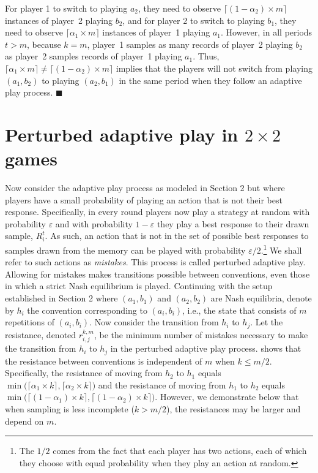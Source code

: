 For player 1 to switch to playing $a_2$, they need to observe $\lceil (1-\alpha_2)\times m\rceil$ instances of player~2 playing $b_2$, and for player 2 to switch to playing $b_1$, they need to observe $\lceil \alpha_1\times m\rceil$ instances of player~1 playing $a_1$.
%
However, in all periods $t>m$, because $k=m$, player~1 samples as many records of player~2 playing $b_2$ as player~2 samples records of player~1 playing $a_1$. 
Thus, $\lceil \alpha_1\times m\rceil \neq\lceil (1-\alpha_2)\times m\rceil$ implies that the players will not switch from playing $(a_1,b_2)$ to playing $(a_2,b_1)$ in the same period when they follow an adaptive play process.    
%
$\blacksquare$

\section{Perturbed adaptive play in $2 \times 2$ games}

Now consider the adaptive play process as modeled in Section 2 but where players have a small probability of playing an action that is not their best response. Specifically, in every round players now play a strategy at random with probability $\varepsilon$ and with probability $1-\varepsilon$ they play a best response to their drawn sample, $R_i^{t}$. As such, an action that is not in the set of possible best responses to samples drawn from the memory can be played with probability $\varepsilon/2$.\footnote{The $1/2$ comes from the fact that each player has two actions, each of which they choose with equal probability when they
play an action at random.} We shall refer to such actions as \textit{mistakes}. This process is called perturbed adaptive play. Allowing for mistakes makes transitions possible between conventions, even those in which a strict Nash equilibrium is played. Continuing with the setup established in Section 2 where $(a_1, b_1)$ and $(a_2, b_2)$ are Nash equilibria, denote by $h_i$ the convention corresponding to $(a_i, b_i)$, i.e., the state that consists of $m$
repetitions of $(a_i, b_i)$.
Now consider the transition from $h_i$ to $h_j$. Let the resistance, denoted $r_{i,j}^{k,m}$, be the minimum number of mistakes necessary to make the transition from $h_i$ to $h_j$ in the perturbed adaptive play process.
\cite{Young1998} shows that the resistance between conventions is independent of $m$ when $k \leq m/2$. Specifically, the resistance of moving from $h_2$ to $h_1$ equals $\min\big(\lceil \alpha_1 \times k \rceil,\lceil \alpha_2 \times k \rceil\big)$ and the resistance of moving from $h_1$ to $h_2$ equals $\min\big(\lceil (1-\alpha_1) \times k \rceil,\lceil (1-\alpha_2) \times  k \rceil\big)$. However, we demonstrate below that when sampling is less incomplete ($k > m/2$), the resistances may be larger and depend on $m$.


